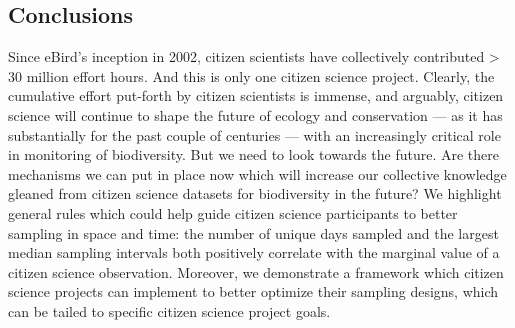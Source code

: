 \documentclass[9pt,twocolumn,twoside,lineno]{pnas-new}
\begin{document}
\subsection*{Conclusions}
Since eBird's inception in 2002, citizen scientists have collectively contributed > 30 million effort hours. And this is only one citizen science project. Clearly, the cumulative effort put-forth by citizen scientists is immense, and arguably, citizen science will continue to shape the future of ecology and conservation --- as it has substantially for the past couple of centuries \cite{silvertown2009new} --- with an increasingly critical role in monitoring of biodiversity\cite{mckinley2017citizen, pocock2018vision}. But we need to look towards the future. Are there mechanisms we can put in place now which will increase our collective knowledge gleaned from citizen science datasets for biodiversity in the future? We highlight general rules which could help guide citizen science participants to better sampling in space and time: the number of unique days sampled and the largest median sampling intervals both positively correlate with the marginal value of a citizen science observation. Moreover, we demonstrate a framework which citizen science projects can implement to better optimize their sampling designs, which can be tailed to specific citizen science project goals.
\end{document}
